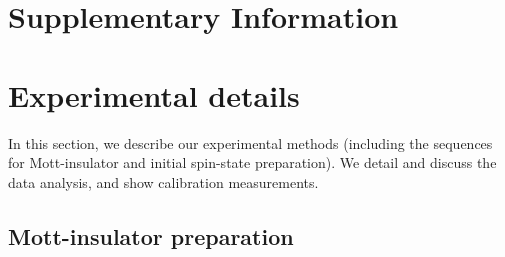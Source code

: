 \documentclass[
 reprint,
 superscriptaddress,
 amsmath,amssymb,
 aps,
 pra,
]{revtex4-2}
\begin{document}


\clearpage



\setcounter{equation}{0}
\setcounter{figure}{0}
\setcounter{table}{0}
\renewcommand{\theequation}{S\arabic{equation}}
\renewcommand{\thefigure}{S\arabic{figure}}
\renewcommand{\thetable}{S\arabic{table}}


\section*{Supplementary Information}


\section{\label{sec:exp-details}Experimental details}

In this section, we describe our experimental methods (including the sequences for Mott-insulator and initial spin-state preparation). We detail and discuss the data analysis, and show calibration measurements.


\subsection{Mott-insulator preparation}
\end{document}
